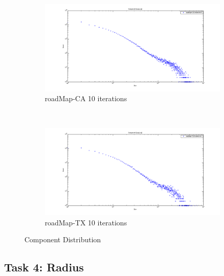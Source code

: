 \begin{figure} 
    \addtocounter{figure}{1}
    \centering 
        \begin{subfigure}[htbp]{0.8\textwidth}
                \includegraphics[width=\textwidth]{FIG/cp-ca.png}
                \caption{roadMap-CA 10 iterations}
                \label{fig:cp-pa}
        \end{subfigure}
        ~ %
        \begin{subfigure}[htbp]{0.8\textwidth}
                \includegraphics[width=\textwidth]{FIG/cp-tx.png}
                \caption{roadMap-TX 10 iterations}
                \label{fig:cp-tx}
        \end{subfigure}
    \caption{Component Distribution}
    \label{fig:results3-1}
\end{figure} 


\subsection{Task 4: Radius}
